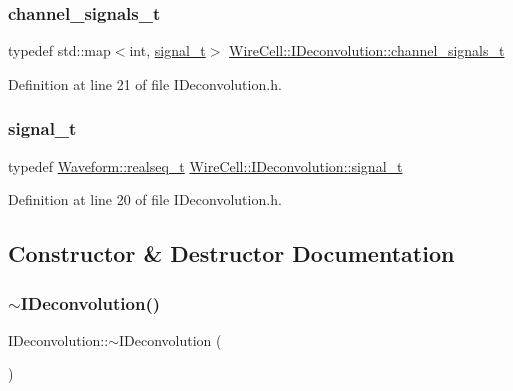 \subsubsection{\texorpdfstring{channel\+\_\+signals\+\_\+t}{channel\_signals\_t}}
{\footnotesize\ttfamily typedef std\+::map$<$int, \hyperlink{class_wire_cell_1_1_i_deconvolution_a8b4391e337dad4e658a33b1a6ee3dab5}{signal\+\_\+t}$>$ \hyperlink{class_wire_cell_1_1_i_deconvolution_a02ef33d767e273c9fbb9a1b27dc84f77}{Wire\+Cell\+::\+I\+Deconvolution\+::channel\+\_\+signals\+\_\+t}}



Definition at line 21 of file I\+Deconvolution.\+h.

\mbox{\label{class_wire_cell_1_1_i_deconvolution_a8b4391e337dad4e658a33b1a6ee3dab5}} 
\subsubsection{\texorpdfstring{signal\+\_\+t}{signal\_t}}
{\footnotesize\ttfamily typedef \hyperlink{namespace_wire_cell_1_1_waveform_a479175e541c8545e87cd8063b74b6956}{Waveform\+::realseq\+\_\+t} \hyperlink{class_wire_cell_1_1_i_deconvolution_a8b4391e337dad4e658a33b1a6ee3dab5}{Wire\+Cell\+::\+I\+Deconvolution\+::signal\+\_\+t}}



Definition at line 20 of file I\+Deconvolution.\+h.



\subsection{Constructor \& Destructor Documentation}
\mbox{\label{class_wire_cell_1_1_i_deconvolution_a9efd63e0381091260709ac8bc191b15d}} 
\subsubsection{\texorpdfstring{$\sim$\+I\+Deconvolution()}{~IDeconvolution()}}
{\footnotesize\ttfamily I\+Deconvolution\+::$\sim$\+I\+Deconvolution (\begin{DoxyParamCaption}{ }\end{DoxyParamCaption})\hspace{0.3cm}{\ttfamily [virtual]}}



